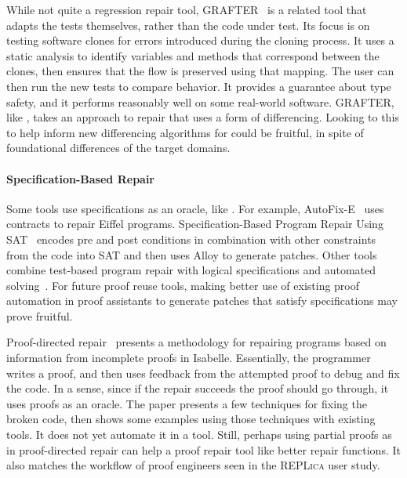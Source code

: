 While not quite a regression repair tool, GRAFTER~\cite{Zhang:2017:ATD:3097368.3097448} is a related tool that adapts the tests themselves,
rather than the code under test. Its focus is on testing software clones for errors introduced during the
cloning process. It uses a static analysis to identify variables and methods that correspond between the clones,
then ensures that the flow is preserved using that mapping. The user can then run the new tests to compare behavior.
It provides a guarantee about type safety, and it performs reasonably well on some real-world software.
GRAFTER, like \toolnamec, takes an approach to repair that uses a form of differencing.
Looking to this to help inform new differencing algorithms for \sysnamelong could be fruitful,
in spite of foundational differences of the target domains.

\paragraph{Specification-Based Repair}
Some tools use specifications as an oracle, like \sysnamelong.
For example, AutoFix-E~\cite{Wei:2010:AFP:1831708.1831716, pei2014automated} uses contracts to repair Eiffel programs. 
Specification-Based Program Repair Using SAT~\cite{gopinath2011specification}
encodes pre and post conditions in combination with other constraints from the code 
into SAT and then uses Alloy to generate patches.
Other tools combine test-based program repair with logical specifications and automated solving~\cite{10.1007/978-3-540-24721-0_20, nguyen2013semfix, nguyen2013semfix, Xuan:2017:NAR:3071893.3071964, Mechtaev:2015:DLS:2818754.2818811, Ke:2015:RPS:2916135.2916260}.
For future proof reuse tools, making better use of existing proof automation in proof assistants to generate
patches that satisfy specifications may prove fruitful.

Proof-directed repair~\cite{dennis2006proof} presents a methodology
for repairing programs based on information from incomplete proofs in Isabelle.
Essentially, the programmer writes a proof, and then uses feedback
from the attempted proof to debug and fix the code.
In a sense, since if the repair succeeds the proof should go through,
it uses proofs as an oracle. The paper presents a few techniques for fixing the broken code,
then shows some examples using those techniques with existing tools.
It does not yet automate it in a tool.
Still, perhaps using partial proofs as in proof-directed repair can help a proof repair tool like \sysnamelong
better repair functions.
It also matches the workflow of proof engineers seen in the \textsc{REPLica} user study. %

